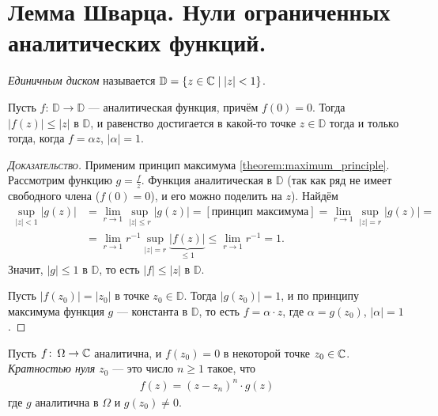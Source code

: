 \documentclass[../complex-analysis.tex]{subfiles}
\begin{document}
\newpage
\section{Лемма Шварца. Нули ограниченных аналитических функций.}

\begin{df*}
 \textit{Единичным диском} называется $ \mathbb D = \left\{ z \in \mathbb{C} \;\middle|\; \left| z \right| < 1 \right\} $.
\end{df*}

\begin{lm}[Шварца]
 Пусть $ f \colon\, \mathbb D \to \mathbb D $ --- аналитическая функция, причём $ f(0) = 0 $. Тогда $ \left| f(z) \right| \leqslant \left| z \right| $ в $ \mathbb D $, и равенство достигается в какой-то точке $ z \in \mathbb D $ тогда и только тогда, когда $f = \alpha z$, $ \left| \alpha  \right| = 1 $.
\end{lm}
\begin{proof}[\normalfont\textsc{Доказательство}]
Применим принцип максимума \eqref{theorem:maximum_principle}. Рассмотрим функцию $ g=\frac{f}{z} $. Функция аналитическая в $ \mathbb D $ (так как ряд не имеет свободного члена ($ f(0) = 0 $), и его можно поделить на $ z $). Найдём
 \begin{align*}
  \sup_{\left| z \right| < 1} \left| g(z) \right| &= \lim_{r \to 1} \sup_{\left| z \right| \leqslant r} \left| g(z) \right| = [\text{принцип максимума}] = \lim_{r\to 1} \sup_{\left| z \right| = r} \left| g(z) \right| = \\
  &= \lim_{r \to 1} r^{-1} \sup_{\left| z \right| = r} \underbrace{\left| f(z) \right|}_{\leq 1} \leqslant \lim_{r \to 1} r^{-1} = 1.
 \end{align*} Значит, $ \left| g \right| \leqslant 1 $ в $ \mathbb D $, то есть $ \left| f \right| \leqslant \left| z \right| $ в $ \mathbb D $.

 Пусть $ \left|f(z_0) \right| = \left| z_0 \right| $ в точке $ z_0 \in \mathbb D $. Тогда $ |g(z_0)| = 1 $, и по принципу максимума функция $ g $ --- константа в $ \mathbb D $, то есть $ f = \alpha \cdot z $, где $ \alpha = g(z_0) $, $ \left| \alpha \right|=1 $.
\end{proof}

\begin{df}
 Пусть $ f \colon\, \Omega \to \mathbb{C} $ аналитична, и $ f(z_0) = 0 $ в некоторой точке $ z_0 \in \mathbb{C} $. \textit{Кратностью нуля $ z_0 $} --- это число $ n \geqslant 1 $ такое, что
 \begin{align*}
  f(z) = (z-z_n)^{n} \cdot g(z)
 \end{align*} где $ g $ аналитична в $ \Omega $ и $ g(z_0) \neq 0 $.
\end{df}
\end{document}
